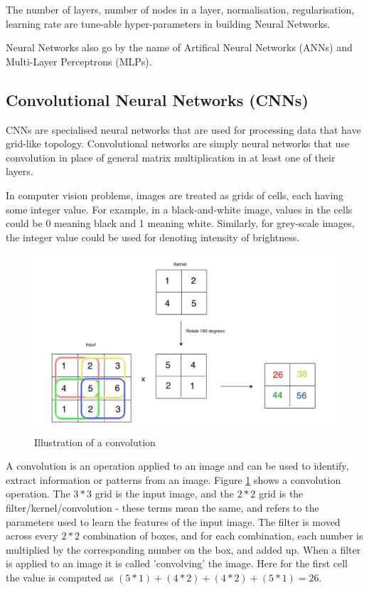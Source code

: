 The number of layers, number of nodes in a layer, normalisation, regularisation, learning rate are tune-able hyper-parameters in building Neural Networks.



Neural Networks also go by the name of Artifical Neural Networks (ANNs) and Multi-Layer Perceptrons (MLPs).

\subsection{Convolutional Neural Networks (CNNs)}
CNNs are specialised neural networks that are used for processing data that have grid-like topology. Convolutional networks are simply neural networks that use convolution in place of general matrix multiplication in at least one of their layers.

In computer vision problems, images are treated as grids of cells, each having some integer value. For example, in a black-and-white image, values in the cells could be 0 meaning black and 1 meaning white. Similarly, for grey-scale images, the integer value could be used for denoting intensity of brightness.

\begin{figure}
    \centering
    \includegraphics[height=0.2\paperheight]{Figures/CNN_explain.png}
    \caption{Illustration of a convolution
    \cite{noauthor_convolutional_nodate}}
    \label{fig:convolution_diagram}
\end{figure}


A convolution is an operation applied to an image and can be used to identify, extract information or patterns from an image. Figure \ref{fig:convolution_diagram} shows a convolution operation. The \(3 * 3\)  grid is the input image, and the \(2 * 2\) grid is the filter/kernel/convolution - these terms mean the same, and refers to the parameters used to learn the features of the input image. The filter is moved across every \(2 * 2\) combination of boxes, and for each combination, each number is multiplied by the corresponding number on the box, and added up. When a filter is applied to an image it is called 'convolving' the image. Here for the first cell the value is computed as \( (5*1)+(4*2)+(4*2)+(5*1) = 26\).

